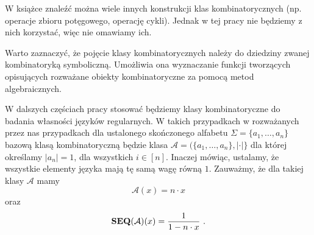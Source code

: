 W książce \cite{Flajolet_08} znaleźć można wiele innych konstrukcji klas kombinatorycznych (np. operacje zbioru potęgowego, operację cykli). Jednak w tej pracy nie będziemy z nich korzystać, więc nie omawiamy ich.

Warto zaznaczyć, że pojęcie klasy kombinatorycznych należy do dziedziny zwanej kombinatoryką symboliczną. Umożliwia ona wyznaczanie funkcji tworzących opisujących rozważane obiekty kombinatoryczne za pomocą metod algebraicznych.  

W dalszych częściach pracy stosować będziemy klasy kombinatoryczne  do badania własności języków regularnych. W takich przypadkach w rozważanych przez nas przypadkach dla ustalonego skończonego alfabetu $\Sigma = \{a_1,\ldots,a_n\}$ bazową klasą kombinatoryczną będzie klasa
$\mathcal{A} = (\{a_1,\ldots,a_n\}, |\cdot|\}$ dla której określamy $|a_n| = 1$, dla wszystkich $i\in [n]$. Inaczej mówiąc, ustalamy, że wszystkie elementy języka mają tę samą wagę równą $1$. Zauważmy, że dla takiej klasy $\mathcal{A}$ mamy 
$$\mathcal{A}(x) = n \cdot x$$
oraz
$$\mathbf{SEQ}(\mathcal{A})(x) = \frac{1}{1-n \cdot x}~.$$